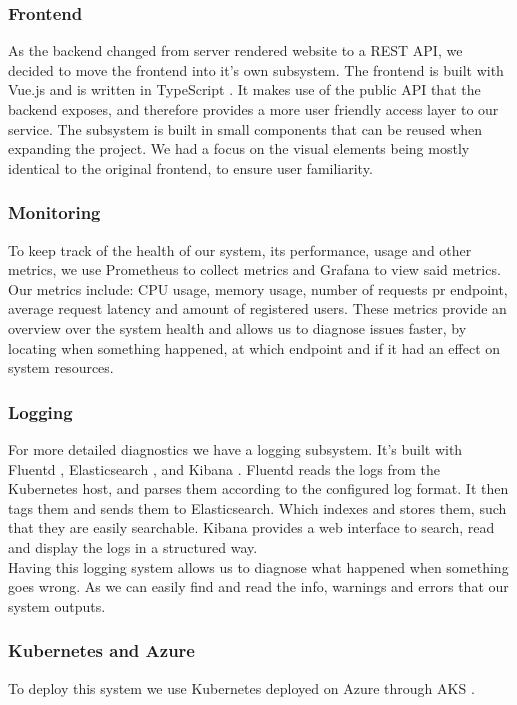 \subsubsection{Frontend}
As the backend changed from server rendered website to a REST API, we decided to move the frontend into it's own subsystem.
The frontend is built with Vue.js \cite{tool:vue} and is written in TypeScript \cite{tool:typescript}.
It makes use of the public API that the backend exposes, and therefore provides a more user friendly access layer to our service.
The subsystem is built in small components that can be reused when expanding the project. We had a focus on the visual elements being mostly identical to the original frontend, to ensure user familiarity.

\subsubsection{Monitoring}
To keep track of the health of our system, its performance, usage and other metrics, we use Prometheus \cite{tool:prometheus} to collect metrics and Grafana \cite{tool:grafana} to view said metrics.
Our metrics include: CPU usage, memory usage, number of requests pr endpoint, average request latency and amount of registered users.
These metrics provide an overview over the system health and allows us to diagnose issues faster, by locating when something happened, at which endpoint and if it had an effect on system resources.

\subsubsection{Logging}
For more detailed diagnostics we have a logging subsystem. It's built with Fluentd \cite{tool:fluentd}, Elasticsearch \cite{tool:elasticsearch}, and Kibana \cite{tool:kibana}.
Fluentd reads the logs from the Kubernetes host, and parses them according to the configured log format.
It then tags them and sends them to Elasticsearch. Which indexes and stores them, such that they are easily searchable.
Kibana provides a web interface to search, read and display the logs in a structured way.\\

Having this logging system allows us to diagnose what happened when something goes wrong.
As we can easily find and read the info, warnings and errors that our system outputs.

\subsubsection{Kubernetes and Azure}
To deploy this system we use Kubernetes \cite{tool:kubernetes} deployed on Azure \cite{tool:azure} through AKS \cite{tool:aks}.

